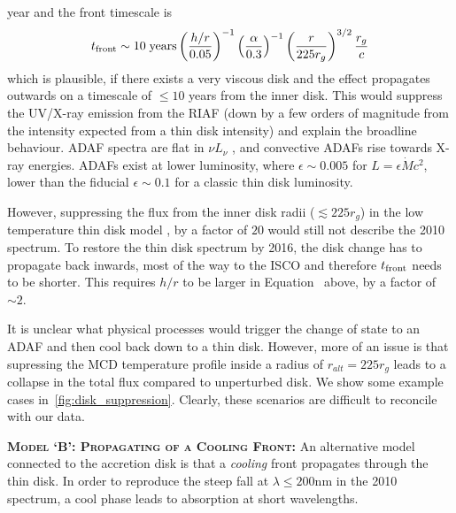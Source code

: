 \documentclass[11pt,a4paper]{article}
\begin{document}
year and the front timescale is
\begin{equation}
    t_{\rm front}  \sim  10 \; {\rm years} \left(\frac{h/r}{0.05}\right)^{-1}
                                                           \left(\frac{\alpha}{0.3}\right)^{-1}  
                                                           \left(\frac{r}{225r_{g}}\right)^{3/2}  
                                                           \frac{r_{g}}{c}
\label{eqn:t_front}
\end{equation}
which is plausible, if there exists a very viscous disk and the effect
propagates outwards on a timescale of $\leq 10$ years from the inner
disk. This would suppress the UV/X-ray emission from the RIAF (down by
a few orders of magnitude from the intensity expected from a thin disk
intensity) and explain the broadline behaviour.  ADAF spectra are flat
in $\nu L_{\nu}$ \citet{Narayan1998, Abramowicz2002, Abramowicz2013},
and convective ADAFs rise towards X-ray energies. ADAFs exist at lower
luminosity, where $\epsilon \sim 0.005$ for $L=\epsilon \dot{M}
c^{2}$, lower than the fiducial $\epsilon \sim 0.1$ for a classic thin
disk luminosity.

However, suppressing the flux from the inner disk radii ($\lesssim 225 r_{g}$)
in the low temperature thin disk model \citep{Narayan1997, Gammie1999,
Agol_Krolik2000, Afshordi_Paczynski2003, Ford2018}, by a factor of
$20$ would still not describe the 2010 spectrum. To restore the thin disk
spectrum by 2016, the disk change has to propagate back inwards, most
of the way to the ISCO and therefore $t_{\rm front}$ needs to be
shorter. This requires $h/r$ to be larger in
Equation~\label{eqn:t_front} above, by a factor of $\sim 2$.

It is unclear what physical processes would trigger the change of
state to an ADAF and then cool back down to a thin disk. However, more
of an issue is that supressing the MCD temperature profile inside a
radius of $r_{alt} = 225 r_{g}$ leads to a collapse in the total
flux compared to unperturbed disk. We show some example cases
in~\ref{fig:disk_suppression}. Clearly, these scenarios are difficult
to reconcile with our data.

\smallskip \smallskip
\noindent
\textbf{\textsc{Model `B': Propagating of a Cooling Front: }}
An alternative model connected to the accretion disk is that a
\emph{cooling} front propagates through the thin disk.  In order to
reproduce the steep fall at $\lambda \leq 200$nm in the 2010 spectrum,
a cool phase leads to absorption at short wavelengths.
\end{document}
